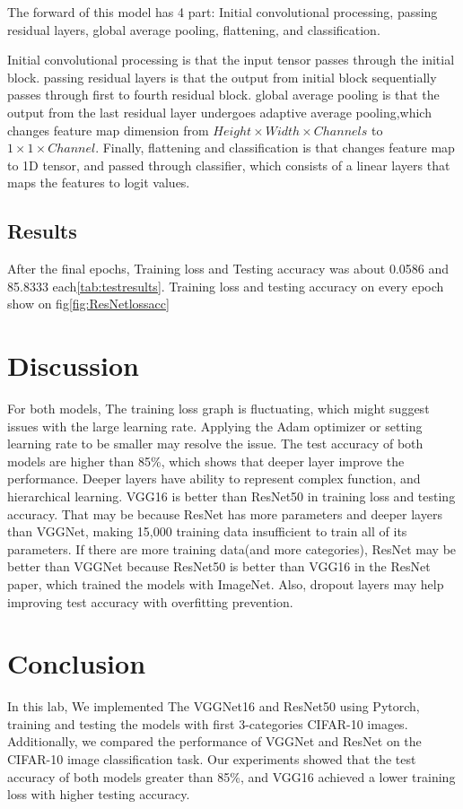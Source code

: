 \documentclass[extendedabs]{bmvc2k}
\begin{document}
The forward of this model has 4 part: Initial convolutional processing, passing residual layers, global average pooling, flattening, and classification.

Initial convolutional processing is that the input tensor passes through the initial block. passing residual layers is that the output from initial block sequentially passes through first to fourth residual block. global average pooling is that the output from the last residual layer undergoes adaptive average pooling,which changes feature map dimension from $Height\times Width \times Channels$ to $1\times1\times Channel$. Finally, flattening and classification is that changes feature map to 1D tensor, and passed through classifier, which consists of a linear layers that maps the features to logit values.

\subsection{Results}
After the final epochs, Training loss and Testing accuracy was about 0.0586 and 85.8333 each\ref{tab:testresults}. Training loss and testing accuracy on every epoch show on fig\ref{fig:ResNetlossacc}

\section{Discussion}
For both models, The training loss graph is fluctuating, which might suggest issues with the large learning rate. Applying the Adam optimizer\cite{adamopt} or setting learning rate to be smaller may resolve the issue. The test accuracy of both models are higher than 85\%, which shows that deeper layer improve the performance. Deeper layers have ability to represent complex function, and hierarchical learning. VGG16 is better than ResNet50 in training loss and testing accuracy. That may be because ResNet has more parameters and deeper layers than VGGNet, making 15,000 training data insufficient to train all of its parameters. If there are more training data(and more categories), ResNet may be better than VGGNet because ResNet50 is better than VGG16 in the ResNet paper\cite{resnet_paper}, which trained the models with ImageNet. Also, dropout layers may help improving test accuracy with overfitting prevention.
\section{Conclusion}
In this lab, We implemented The VGGNet16 and ResNet50 using Pytorch, training and testing the models with first 3-categories CIFAR-10 images. Additionally, we compared the performance of VGGNet and ResNet on the CIFAR-10 image classification task. Our experiments showed that the test accuracy of both models greater than 85\%, and VGG16 achieved a lower training loss with higher testing accuracy.
\end{document}
